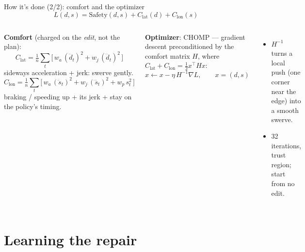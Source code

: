 \begin{frame}{How it's done (2/2): comfort and the optimizer}
  \small
  \[ L(d,s) = \mathrm{Safety}(d,s) + C_{\text{lat}}(d) + C_{\text{lon}}(s) \]
  \begin{columns}[T]
    \textbf{Comfort} (charged on the \emph{edit}, not the plan):
    \[ C_{\text{lat}} = \tfrac1n\sum_t \Big[\,w_a\,(\ddot d_t)^2 + w_j\,(\dddot d_t)^2\,\Big] \]
    {\footnotesize sideways acceleration + jerk: swerve gently.}
    \[ C_{\text{lon}} = \tfrac1n\sum_t \Big[\,w_a\,(\ddot s_t)^2 + w_j\,(\dddot s_t)^2 + w_p\, s_t^{2}\,\Big] \]
    {\footnotesize braking / speeding up + its jerk + stay on the policy's timing.}

    \textbf{Optimizer}: CHOMP --- gradient descent preconditioned by the
    comfort matrix $H$, where $C_{\text{lat}} + C_{\text{lon}} = \tfrac12 x^\top H x$:
    \[ x \leftarrow x - \eta\,H^{-1}\nabla L, \qquad x = (d, s) \]
    \begin{itemize}\itemsep1pt\footnotesize
      \item $H^{-1}$ turns a local push (one corner near the edge) into a smooth swerve.
      \item 32 iterations, trust region; start from no edit.
    \end{itemize}
  \end{columns}
\end{frame}


\section{Learning the repair}

